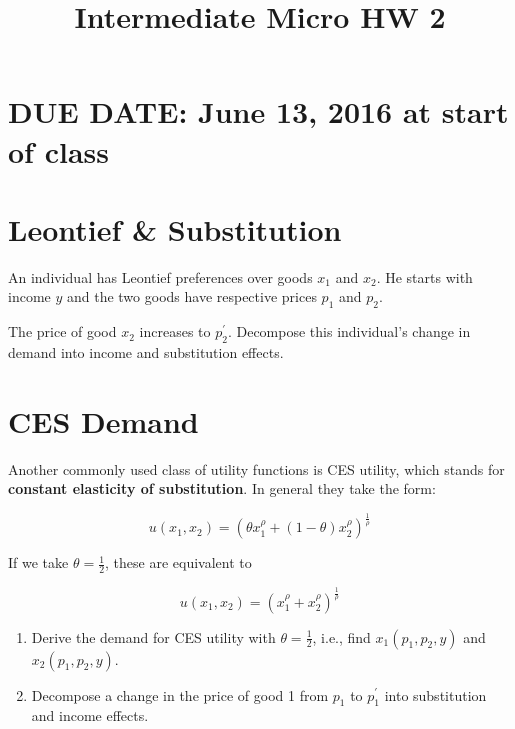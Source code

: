 \documentclass{article}
\begin{document}
\title{Intermediate Micro HW 2}

\maketitle

\section*{DUE DATE: June 13, 2016 at start of class}

\section{Leontief \& Substitution}

An individual has Leontief preferences over goods $x_1$ and $x_2$. He starts with income $y$ and the two goods have respective prices $p_1$ and $p_2$.

The price of good $x_2$ increases to $p_2^{'}$. Decompose this individual's change in demand into income and substitution effects.

\section{CES Demand}

Another commonly used class of utility functions is CES utility, which stands for \textbf{constant elasticity of substitution}. In general they take the form:

\[
u(x_1, x_2) = \left(\theta x_1^{\rho} + (1-\theta) x_2^{\rho}\right)^{\frac1{\rho}}
\]

If we take $\theta = \frac12$, these are equivalent to

\[
u(x_1, x_2) = \left(x_1^{\rho} + x_2^{\rho}\right)^{\frac1{\rho}}
\]

\begin{enumerate}
\item Derive the demand for CES utility with $\theta = \frac12$, i.e., find $x_1(p_1, p_2, y)$ and $x_2(p_1, p_2, y)$.
\item Decompose a change in the price of good 1 from $p_1$ to $p_1^{'}$ into substitution and income effects.
\end{enumerate}
\end{document}
